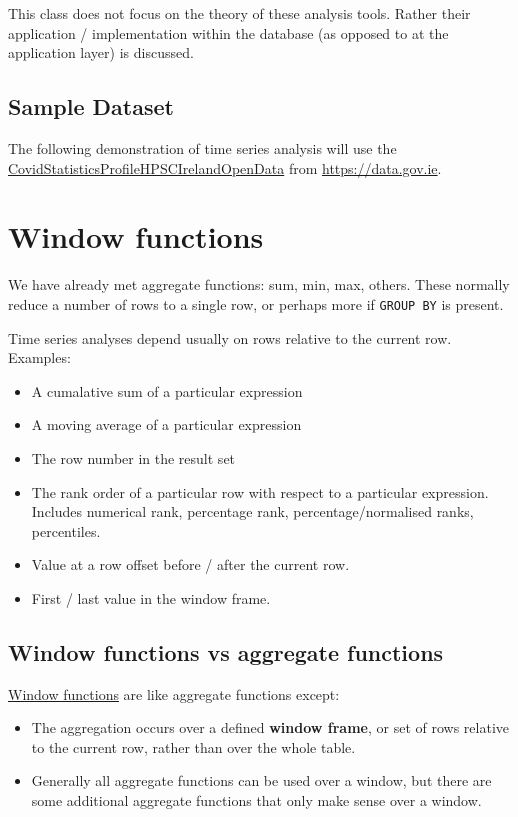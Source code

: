 \documentclass[slides]{pgnotes}
\begin{document}
This class does not focus on the theory of these analysis tools.
Rather their application / implementation within the database (as opposed to at the application layer) is discussed.

\subsection{Sample Dataset}

The following demonstration of time series analysis will use the \href{https://data.gov.ie/dataset/covidstatisticsprofilehpscirelandopendata1}{CovidStatisticsProfileHPSCIrelandOpenData} from \url{https://data.gov.ie}.


\section{Window functions}

We have already met aggregate functions: sum, min, max, others. 
These normally reduce a number of rows to a single row, or perhaps more if \texttt{GROUP BY} is present.

Time series analyses depend usually on rows relative to the current row. 
Examples:
\begin{itemize}
\item A cumalative sum of a particular expression
\item A moving average of a particular expression
\item The row number in the result set
\item The rank order of a particular row with respect to a particular expression. Includes numerical rank, percentage rank, percentage/normalised ranks, percentiles.
\item Value at a row offset before / after the current row.
\item First / last value in the window frame. 
\end{itemize}

\subsection{Window functions vs aggregate functions}

\href{https://www.postgresql.org/docs/13/tutorial-window.html}{Window functions} are like aggregate functions except:
\begin{itemize}
\item The aggregation occurs over a defined \textbf{window frame}, or set of rows relative to the current row, rather than over the whole table.
\item 
  Generally all aggregate functions can be used over a window, but there are some additional aggregate functions that only make sense over a window.
  \end{itemize}
\end{document}
